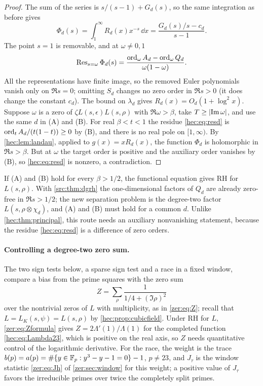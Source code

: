 \begin{proof}
The sum of the series is $s/(s-1)+G_d(s)$, so the same integration as before gives
\[
 \Phi_d(s)=\int_1^\infty R_d(x)x^{-s}\,\dd x=\frac{G_d(s)/s-c_d}{s-1}.
\]
The point $s=1$ is removable, and at $\omega\ne0,1$
\begin{equation}\label{hec:eq:resd}
 \operatorname{Res}_{s=\omega}\Phi_d(s)=\frac{\operatorname{ord}_\omega A_d-\operatorname{ord}_\omega Q_d}{\omega(1-\omega)}.
\end{equation}
All the representations have finite image, so the removed Euler polynomials vanish only on $\Re s=0$;
omitting $S_d$ changes no zero order in $\Re s>0$ (it does change the constant $c_d$). The bound on
$\lambda_d$ gives $R_d(x)=O_d(1+\log^2x)$. Suppose $\omega$ is a zero of $\zeta L(s,\epsilon)L(s,\rho)$ with
$\Re\omega>\beta$, take $T\ge\lvert\operatorname{Im}\omega\rvert$, and use the same $d$ in (A) and (B). For real $\beta<t<1$
the residue \eqref{hec:eq:resd} is $\operatorname{ord}_tA_d/(t(1-t))\ge0$ by (B), and there is no real pole on
$[1,\infty)$. By \cref{hec:lem:landau}, applied to $g(x)=xR_d(x)$, the function $\Phi_d$ is holomorphic in
$\Re s>\beta$. But at $\omega$ the target order is positive and the auxiliary order vanishes by (B), so
\eqref{hec:eq:resd} is nonzero, a contradiction.
\end{proof}

If (A) and (B) hold for every $\beta>1/2$, the functional equation gives RH for $L(s,\rho)$. With
\cref{src:thm:dgrh} the one-dimensional factors of $Q_d$ are already zero-free in $\Re s>1/2$; the new
separation problem is the degree-two factor $L(s,\rho\otimes\chi_d)$, and (A) and (B) must hold for a
common $d$. Unlike \cref{hec:thm:principal}, this route needs an auxiliary nonvanishing statement, because
the residue \eqref{hec:eq:resd} is a difference of zero orders.

\paragraph{Controlling a degree-two zero sum.}
The two sign tests below, a sparse sign test and a race in a fixed window, compare a bias from the prime
squares with the zero sum
\[
 Z=\sum_{\rho}\frac1{1/4+(\Im\rho)^2}
\]
over the nontrivial zeros of $L$ with multiplicity, as in \eqref{zer:eq:Z}; recall that
$L=L_K(s,\psi)=L(s,\rho)$ by \cref{hec:prop:cubicfield}. Under RH for $L$,
\eqref{zer:eq:Zformula} gives $Z=2\Lambda'(1)/\Lambda(1)$ for the completed function
\eqref{hec:eq:Lambda23}, which is positive on the real axis, so $Z$ needs quantitative control of the
logarithmic derivative. For the race, the weight is the trace $b(p)=a(p)=\#\{y\in\mathbb{F}_p:y^3-y-1=0\}-1$,
$p\ne23$, and $J_\tau$ is the window statistic \eqref{zer:eq:Jh} of \cref{zer:sec:window} for this weight;
a positive value of $J_\tau$ favors the irreducible primes over twice the completely split primes.

